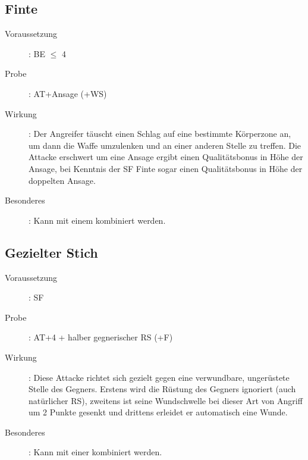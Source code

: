 \subsection{Finte }
\label{chap.bAT.finte}
\begin{description}
    \item[Voraussetzung]: BE\textrm{ ${\leq}$ }4
    \item[Probe]: AT+Ansage (+WS)
    \item[Wirkung]: Der Angreifer täuscht einen Schlag auf eine bestimmte
        Körperzone an, um dann die Waffe umzulenken und an einer anderen Stelle
        zu treffen. Die Attacke erschwert um eine Ansage ergibt einen
        Qualitätsbonus in Höhe der Ansage, bei Kenntnis der SF Finte sogar
        einen Qualitätsbonus in Höhe der doppelten Ansage.
    \item[Besonderes]: Kann mit einem  kombiniert
        werden.
\end{description}

\subsection{Gezielter Stich }
\label{chap.bAT.stich}
\begin{description}
    \item[Voraussetzung]: SF 
    \item[Probe]: AT+4 + halber gegnerischer RS (+F)
    \item[Wirkung]: Diese Attacke richtet sich gezielt gegen eine verwundbare,
        ungerüstete Stelle des Gegners. Erstens wird die Rüstung des Gegners
        ignoriert (auch natürlicher RS), zweitens ist seine Wundschwelle bei
        dieser Art von Angriff um 2 Punkte gesenkt und drittens erleidet er
        automatisch eine Wunde.
    \item[Besonderes]: Kann mit einer  kombiniert werden.
\end{description}

